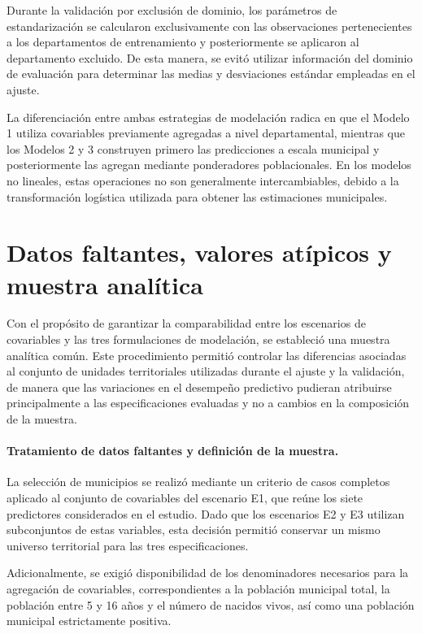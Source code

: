 Durante la validación por exclusión de dominio, los parámetros de estandarización se calcularon exclusivamente con las observaciones pertenecientes a los departamentos de entrenamiento y posteriormente se aplicaron al departamento excluido. De esta manera, se evitó utilizar información del dominio de evaluación para determinar las medias y desviaciones estándar empleadas en el ajuste.

La diferenciación entre ambas estrategias de modelación radica en que el Modelo 1 utiliza covariables previamente agregadas a nivel departamental, mientras que los Modelos 2 y 3 construyen primero las predicciones a escala municipal y posteriormente las agregan mediante ponderadores poblacionales. En los modelos no lineales, estas operaciones no son generalmente intercambiables, debido a la transformación logística utilizada para obtener las estimaciones municipales.



\section{Datos faltantes, valores atípicos y muestra analítica}
\label{sec:met-muestra}

Con el propósito de garantizar la comparabilidad entre los escenarios de covariables y las tres formulaciones de modelación, se estableció una muestra analítica común. Este procedimiento permitió controlar las diferencias asociadas al conjunto de unidades territoriales utilizadas durante el ajuste y la validación, de manera que las variaciones en el desempeño predictivo pudieran atribuirse principalmente a las especificaciones evaluadas y no a cambios en la composición de la muestra.

\paragraph{Tratamiento de datos faltantes y definición de la muestra.}

La selección de municipios se realizó mediante un criterio de casos completos aplicado al conjunto de covariables del escenario E1, que reúne los siete predictores considerados en el estudio. Dado que los escenarios E2 y E3 utilizan subconjuntos de estas variables, esta decisión permitió conservar un mismo universo territorial para las tres especificaciones.

Adicionalmente, se exigió disponibilidad de los denominadores necesarios para la agregación de covariables, correspondientes a la población municipal total, la población entre 5 y 16 años y el número de nacidos vivos, así como una población municipal estrictamente positiva.

